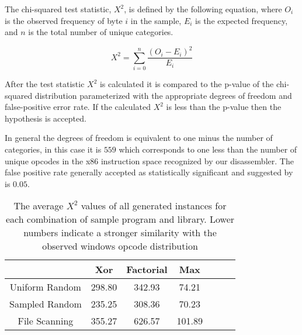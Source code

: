 \documentclass[finalcopy,short]{srpaper}
\begin{document}

        The chi-squared test statistic, $X^2$, is defined by the following
        equation, where $O_i$ is the observed frequency of byte $i$ in the
        sample, $E_i$ is the expected frequency, and $n$ is the total number of
        unique categories.

        $$X^2 = \sum_{i=0}^{n} \frac{(O_i - E_i)^2}{E_i}$$

        After the test statistic $X^2$ is calculated it is compared to the
        p-value of the chi-squared distribution parameterized with the
        appropriate degrees of freedom and false-positive error rate. If the
        calculated $X^2$ is less than the p-value then the hypothesis is
        accepted.

        In general the degrees of freedom is equivalent to one minus the number
        of categories, in this case it is $559$ which corresponds to one less
        than the number of unique opcodes in the x86 instruction space
        recognized by our disassembler. The false positive rate generally
        accepted as statistically significant and suggested by \cite{chisquared}
        is $0.05$.

        \begin{table}
            \centering
            \begin{tabular}{|c||c|c|c|c|c|c|}
                \hline
                                & Xor & Factorial & Max \\
                \hline
                Uniform Random  & 298.80 & 342.93 & 74.21 \\
                \hline
                Sampled Random  & 235.25 & 308.36 & 70.23 \\
                \hline
                File Scanning   & 355.27 & 626.57 & 101.89 \\
                \hline
            \end{tabular}
            \caption{The average $X^2$ values of all generated instances for
                each combination of sample program and library. Lower numbers
                indicate a stronger similarity with the observed windows opcode
                distribution}
            \label{tab:results-windows-like-avg}
        \end{table}
\end{document}
